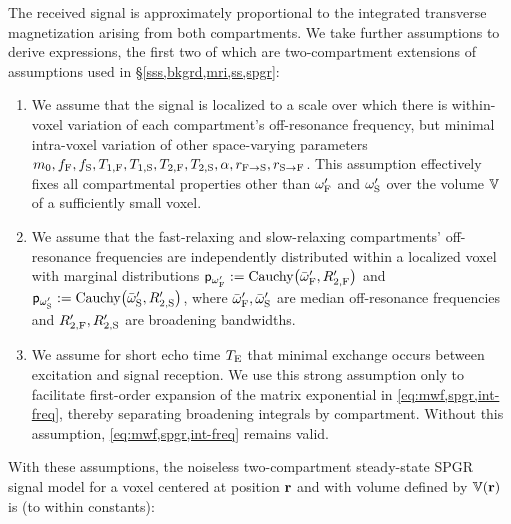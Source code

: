 The received signal
is approximately proportional
to the integrated transverse magnetization
arising from both compartments.
We take further assumptions
to derive expressions,
the first two of which are two-compartment extensions 
of assumptions used 
in \S\ref{sss,bkgrd,mri,ss,spgr}: 
\begin{enumerate}
	\item
		We assume
		that the signal is localized
		to a scale over which 
		there is within-voxel variation
		of each compartment's off-resonance frequency,
		but minimal intra-voxel variation
		of other space-varying parameters
		$m_0, f_{\mathrm{F}}, f_{\mathrm{S}}, T_{1,\mathrm{F}}, T_{1,\mathrm{S}}, T_{2,\mathrm{F}}, T_{2,\mathrm{S}}, \alpha, r_{\mathrm{F}\to\mathrm{S}}, r_{\mathrm{S}\to\mathrm{F}}$.
		This assumption effectively fixes all compartmental properties 
		other than $\omega'_{\mathrm{F}}$ and $\omega'_{\mathrm{S}}$
		over the volume $\mathbb{V}$ of a sufficiently small voxel.
		\label{item:spgr,int}
		
	\item 
		We assume 
		that the fast-relaxing
		and slow-relaxing compartments' off-resonance frequencies	
		are independently distributed 
		within a localized voxel 
		with marginal distributions
		$\dist{\ompf} := \operatorname{Cauchy}\paren{\ompfmed,\Rtpf}$
		and $\dist{\omps} := \operatorname{Cauchy}\paren{\ompsmed,\Rtps}$,
		where $\bar{\omega}_{\mathrm{F}}',\bar{\omega}_{\mathrm{S}}'$ are median off-resonance frequencies
		and $R_{2,\mathrm{F}}',R_{2,\mathrm{S}}'$ are broadening bandwidths.
		\label{item:spgr,freq}
		
	\item 
		We assume 
		for short echo time $T_\mathrm{E}$
		that minimal exchange occurs
		between excitation and signal reception.
		We use this strong assumption
		only to facilitate first-order expansion
		of the matrix exponential
		in \eqref{eq:mwf,spgr,int-freq},
		thereby separating broadening integrals 
		by compartment.
		Without this assumption,
		\eqref{eq:mwf,spgr,int-freq} remains valid.
		\label{item:spgr,exchg0}
\end{enumerate}
With these assumptions,
the noiseless two-compartment steady-state SPGR signal model
for a voxel
centered at position $\mathbf{r}$ 
and with volume defined by $\setV\pr$ 
is (to within constants):
